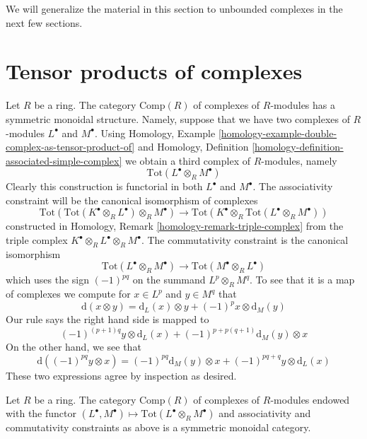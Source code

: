 \medskip\noindent
We will generalize the material in this section to unbounded
complexes in the next few sections.






\section{Tensor products of complexes}
\label{section-symmetric-monoidal}

\noindent
Let $R$ be a ring. The category $\text{Comp}(R)$ of complexes of $R$-modules
has a symmetric monoidal structure. Namely, suppose that we have two
complexes of $R$-modules $L^\bullet$ and $M^\bullet$. Using Homology, Example
\ref{homology-example-double-complex-as-tensor-product-of} and
Homology, Definition \ref{homology-definition-associated-simple-complex}
we obtain a third complex of $R$-modules, namely
$$
\text{Tot}(L^\bullet \otimes_R M^\bullet)
$$
Clearly this construction is functorial in both $L^\bullet$ and $M^\bullet$.
The associativity constraint will be the canonical isomorphism of complexes
$$
\text{Tot}(\text{Tot}(K^\bullet \otimes_R L^\bullet) \otimes_R M^\bullet)
\longrightarrow
\text{Tot}(K^\bullet \otimes_R \text{Tot}(L^\bullet \otimes_R M^\bullet))
$$
constructed in Homology, Remark \ref{homology-remark-triple-complex}
from the triple complex $K^\bullet \otimes_R L^\bullet \otimes_R M^\bullet$.
The commutativity constraint is the canonical isomorphism
$$
\text{Tot}(L^\bullet \otimes_R M^\bullet) \to
\text{Tot}(M^\bullet \otimes_R L^\bullet)
$$
which uses the sign $(-1)^{pq}$ on the summand $L^p \otimes_R M^q$.
To see that it is a map of complexes we compute for
$x \in L^p$ and $y \in M^q$ that
$$
\text{d}(x \otimes y) =
\text{d}_L(x) \otimes y + (-1)^px \otimes \text{d}_M(y)
$$
Our rule says the right hand side is mapped to
$$
(-1)^{(p + 1)q}y \otimes \text{d}_L(x) +
(-1)^{p + p(q + 1)} \text{d}_M(y) \otimes x
$$
On the other hand, we see that
$$
\text{d}((-1)^{pq}y \otimes x) =
(-1)^{pq} \text{d}_M(y) \otimes x +
(-1)^{pq + q} y \otimes \text{d}_L(x)
$$
These two expressions agree by inspection as desired.

\begin{lemma}
\label{lemma-symmetric-monoidal-cat-complexes}
Let $R$ be a ring. The category $\text{Comp}(R)$ of complexes of $R$-modules
endowed with the functor
$(L^\bullet, M^\bullet) \mapsto \text{Tot}(L^\bullet \otimes_R M^\bullet)$
and associativity and commutativity constraints as above is a symmetric
monoidal category.
\end{lemma}

